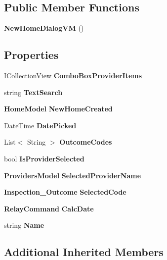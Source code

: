 \subsection*{Public Member Functions}
\begin{DoxyCompactItemize}
\item 
\textbf{ New\+Home\+Dialog\+VM} ()
\end{DoxyCompactItemize}
\subsection*{Properties}
\begin{DoxyCompactItemize}
\item 
I\+Collection\+View \textbf{ Combo\+Box\+Provider\+Items}\hspace{0.3cm}{\ttfamily  [get]}
\item 
string \textbf{ Text\+Search}\hspace{0.3cm}{\ttfamily  [get, set]}
\item 
\textbf{ Home\+Model} \textbf{ New\+Home\+Created}\hspace{0.3cm}{\ttfamily  [get, set]}
\item 
Date\+Time \textbf{ Date\+Picked}\hspace{0.3cm}{\ttfamily  [get, set]}
\item 
List$<$ String $>$ \textbf{ Outcome\+Codes}\hspace{0.3cm}{\ttfamily  [get, set]}
\item 
bool \textbf{ Is\+Provider\+Selected}\hspace{0.3cm}{\ttfamily  [get, set]}
\item 
\textbf{ Providers\+Model} \textbf{ Selected\+Provider\+Name}\hspace{0.3cm}{\ttfamily  [get, set]}
\item 
\textbf{ Inspection\+\_\+\+Outcome} \textbf{ Selected\+Code}\hspace{0.3cm}{\ttfamily  [get, set]}
\item 
\textbf{ Relay\+Command} \textbf{ Calc\+Date}\hspace{0.3cm}{\ttfamily  [get]}
\item 
string \textbf{ Name}\hspace{0.3cm}{\ttfamily  [get]}
\end{DoxyCompactItemize}
\subsection*{Additional Inherited Members}


